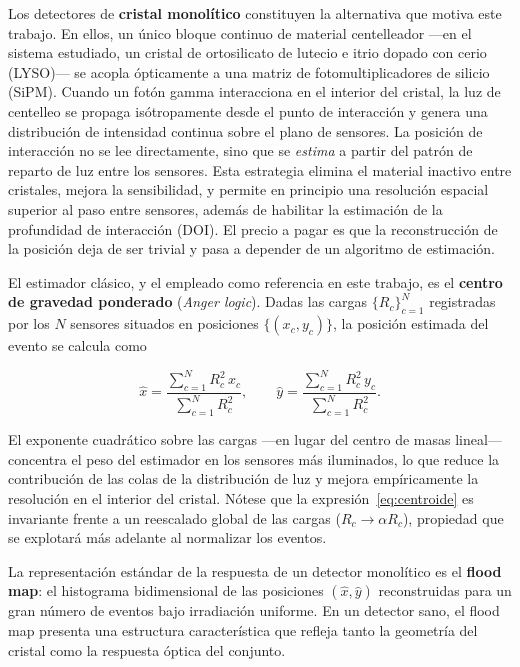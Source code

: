 Los detectores de \textbf{cristal monolítico} constituyen la alternativa que motiva este trabajo.
En ellos, un único bloque continuo de material centelleador ---en el sistema estudiado, un cristal
de ortosilicato de lutecio e itrio dopado con cerio (LYSO)--- se acopla ópticamente a una matriz
de fotomultiplicadores de silicio (SiPM). Cuando un fotón gamma interacciona en el interior del
cristal, la luz de centelleo se propaga isótropamente desde el punto de interacción y genera una
distribución de intensidad continua sobre el plano de sensores. La posición de interacción no se
lee directamente, sino que se \emph{estima} a partir del patrón de reparto de luz entre los
sensores. Esta estrategia elimina el material inactivo entre cristales, mejora la sensibilidad,
y permite en principio una resolución espacial superior al paso entre sensores, además de habilitar
la estimación de la profundidad de interacción (DOI). El precio a pagar es que la reconstrucción
de la posición deja de ser trivial y pasa a depender de un algoritmo de estimación.

El estimador clásico, y el empleado como referencia en este trabajo, es el
\textbf{centro de gravedad ponderado} (\emph{Anger logic}). Dadas las cargas $\{R_c\}_{c=1}^{N}$
registradas por los $N$ sensores situados en posiciones $\{(x_c, y_c)\}$, la posición estimada del
evento se calcula como

\begin{equation}
    \hat{x} = \frac{\sum_{c=1}^{N} R_c^{2}\, x_c}{\sum_{c=1}^{N} R_c^{2}},
    \qquad
    \hat{y} = \frac{\sum_{c=1}^{N} R_c^{2}\, y_c}{\sum_{c=1}^{N} R_c^{2}}.
    \label{eq:centroide}
\end{equation}

El exponente cuadrático sobre las cargas ---en lugar del centro de masas lineal--- concentra el
peso del estimador en los sensores más iluminados, lo que reduce la contribución de las colas de la
distribución de luz y mejora empíricamente la resolución en el interior del cristal. Nótese que la
expresión~\eqref{eq:centroide} es invariante frente a un reescalado global de las cargas
($R_c \rightarrow \alpha R_c$), propiedad que se explotará más adelante al normalizar los eventos.

La representación estándar de la respuesta de un detector monolítico es el \textbf{flood map}: el
histograma bidimensional de las posiciones $(\hat{x}, \hat{y})$ reconstruidas para un gran número de
eventos bajo irradiación uniforme. En un detector sano, el flood map presenta una estructura
característica que refleja tanto la geometría del cristal como la respuesta óptica del conjunto.

